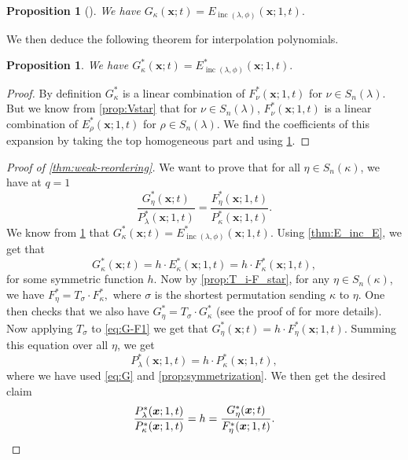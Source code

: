 \documentclass[12pt]{amsart}
\newtheorem{prop}[thm]{Proposition}
\theoremstyle{definition}
\newcommand{\bfx}{\boldsymbol{x}}
\DeclareMathOperator{\inc}{inc}
\def\LW#1{(\textcolor{teal}{LW:#1})}
\begin{document}
\begin{appendices}
\begin{prop}[{\cite[Proposition 4.16]{AyyerMartinWilliams2025}}]\label{prop:hom_G}
    We have 
$G_\kappa(\bfx;t)=E_{\inc(\lambda,\phi)}(\bfx;1,t).$
\end{prop}
We then deduce the following theorem for interpolation polynomials.
\begin{prop}\label{prop:G_E}
    We have 
$G^*_\kappa(\bfx;t)=E^*_{\inc(\lambda,\phi)}(\bfx;1,t).$
\end{prop}
\begin{proof} By definition $G^*_\kappa$ is a linear combination of $F^*_\nu(\bfx;1,t)$ for $\nu\in S_n(\lambda)$. But we know from \cref{prop:Vstar} that for $\nu\in S_n(\lambda)$, $F^*_\nu(\bfx;1,t)$ is a linear combination of $E^*_\rho(\bfx;1,t)$ for $\rho\in S_n(\lambda)$. 
We find the coefficients of this expansion by taking the top homogeneous part and using \cref{prop:hom_G}.
\end{proof}


\begin{proof}[Proof of \cref{thm:weak-reordering}]
We want to prove that for all $\eta\in S_n(\kappa)$, we have at $q=1$
    $$\frac{G^*_\eta(\bfx;t)}{P^*_\lambda(\bfx;1,t)}=\frac{F^*_\eta(\bfx;1,t)}{P^*_\kappa(\bfx;1,t)}.$$
    We know from \cref{prop:G_E} that $G_\kappa^*(\bfx;t)=E^*_{\inc(\lambda,\phi)}(\bfx;1,t)$. Using \cref{thm:E_inc_E}, we get that 
    \begin{equation}\label{eq:G-F1}
      G_\kappa^*(\bfx;t)
      =h\cdotp E_\kappa^*(\bfx;1,t)
      =h\cdotp F_\kappa^*(\bfx;1,t),  
    \end{equation}
    for some symmetric function $h$.
    Now by \cref{prop:T_i-F_star}, for any
    $\eta \in S_n(\kappa)$, we have 
    $F^*_\eta=T_\sigma \cdotp F_\kappa^*,$
    where $\sigma$ is the shortest permutation sending $\kappa$ to $\eta$. One then checks that we also have $G^*_\eta=T_\sigma \cdotp G_\kappa^*$ (see the proof of \cite[Lemma 4.12]{AyyerMartinWilliams2025} for more details).
    Now applying $T_\sigma$ to \cref{eq:G-F1} we get that 
    $ G_\eta^*(\bfx;t)=h\cdotp F_\eta^*(\bfx;1,t).$
    Summing this equation over all $\eta$, we get
    $$P_\lambda^*(\bfx;1,t)=h\cdotp P_\kappa^*(\bfx;1,t),$$
    where we have used \cref{eq:G} and \cref{prop:symmetrization}. We then get the desired claim
    \begin{equation*}
    \frac{P_\lambda^*(\bfx;1,t)}{P_\kappa^*(\bfx;1,t)}=h=\frac{G_\eta^*(\bfx;t)}{F_\eta^*(\bfx;1,t)}.\qedhere    
    \end{equation*}
\end{proof}



\end{appendices}
\end{document}
